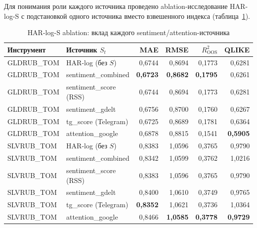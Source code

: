 Для понимания роли каждого источника проведено ablation-исследование
HAR-log-S с подстановкой одного источника вместо взвешенного индекса
(таблица~\ref{tab:har_ablation}).

\begin{table}[h!]
\centering
\caption{HAR-log-S ablation: вклад каждого sentiment/attention-источника}
\label{tab:har_ablation}
\small
\begin{tabular}{llrrrr}
\hline
Инструмент & Источник $S_t$ & MAE & RMSE & $R^2_{\mathrm{OOS}}$ & QLIKE \\
\hline
GLDRUB\_TOM & HAR-log (без $S$)   & 0{,}6744 & 0{,}8694 & 0{,}1773 & 0{,}6281 \\
GLDRUB\_TOM & sentiment\_combined & \textbf{0{,}6723} & \textbf{0{,}8682} & \textbf{0{,}1795} & 0{,}6261 \\
GLDRUB\_TOM & sentiment\_score (RSS) & 0{,}6744 & 0{,}8694 & 0{,}1773 & 0{,}6281 \\
GLDRUB\_TOM & sentiment\_gdelt     & 0{,}6756 & 0{,}8700 & 0{,}1760 & 0{,}6267 \\
GLDRUB\_TOM & tg\_score (Telegram) & 0{,}6725 & 0{,}8689 & 0{,}1781 & 0{,}6364 \\
GLDRUB\_TOM & attention\_google    & 0{,}6878 & 0{,}8815 & 0{,}1541 & \textbf{0{,}5905} \\
\hline
SLVRUB\_TOM & HAR-log (без $S$)   & 0{,}8383 & 1{,}0596 & 0{,}3765 & 0{,}9790 \\
SLVRUB\_TOM & sentiment\_combined & 0{,}8342 & 1{,}0599 & 0{,}3762 & 1{,}0216 \\
SLVRUB\_TOM & sentiment\_score (RSS) & 0{,}8383 & 1{,}0596 & 0{,}3765 & 0{,}9790 \\
SLVRUB\_TOM & sentiment\_gdelt    & 0{,}8400 & 1{,}0610 & 0{,}3749 & 0{,}9765 \\
SLVRUB\_TOM & tg\_score (Telegram) & \textbf{0{,}8352} & 1{,}0621 & 0{,}3736 & 1{,}0364 \\
SLVRUB\_TOM & attention\_google   & 0{,}8466 & \textbf{1{,}0585} & \textbf{0{,}3778} & \textbf{0{,}9729} \\
\hline
\end{tabular}
\end{table}

